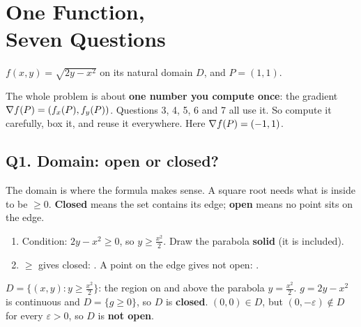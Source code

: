 \renewcommand{\chapribbontext}{Problem 1 \;·\; 8 pts}
\chapter[Problem 1: One Function, Seven Questions]{One Function,\\ Seven Questions}\label{ch:p1}

\begin{examnote}[title={The mock}]
$f(x,y)=\sqrt{2y-x^2}$ on its natural domain $D$, and $P=(1,1)$.
\end{examnote}

\begin{idea}
The whole problem is about \textbf{one number you compute once}: the gradient
$\nabla f(P)=(f_x(P),f_y(P))$. Questions 3, 4, 5, 6 and 7 all use it. So compute it carefully, box it,
and reuse it everywhere. Here $\nabla f(P)=(-1,1)$.
\end{idea}

\section{Q1. Domain: open or closed?}

\begin{idea}
The domain is where the formula makes sense. A square root needs what is inside to be $\ge0$.
\textbf{Closed} means the set contains its edge; \textbf{open} means no point sits on the edge.
\end{idea}

\begin{recipe}
\begin{enumerate}
  \item Condition: $2y-x^2\ge0$, so $y\ge\frac{x^2}2$. Draw the parabola \textbf{solid} (it is included).
  \item $\ge$ gives closed: . \quad A point on the edge gives not open: .
\end{enumerate}
\end{recipe}

\begin{writethis}
$D=\{(x,y): y\ge\frac{x^2}2\}$: the region on and above the parabola $y=\frac{x^2}2$.
$g=2y-x^2$ is continuous and $D=\{g\ge0\}$, so $D$ is \textbf{closed}.
$(0,0)\in D$, but $(0,-\varepsilon)\notin D$ for every $\varepsilon>0$, so $D$ is \textbf{not open}.
\end{writethis}

